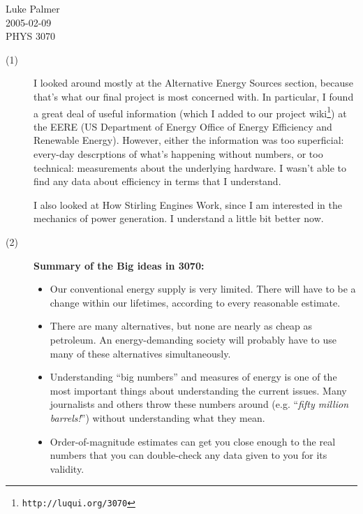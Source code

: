 \documentclass[12pt]{article}
\begin{document}
\noindent Luke Palmer \\
2005-02-09 \\
PHYS 3070

\begin{description}
\item[(1)] I looked around mostly at the Alternative Energy Sources
section, because that's what our final project is most concerned with.
In particular, I found a great deal of useful information (which I added
to our project wiki\footnote{\texttt{http://luqui.org/3070}}) at the
EERE (US Department of Energy Office of Energy Efficiency and Renewable
Energy).  However, either the information was too superficial: every-day
descrptions of what's happening without numbers, or too technical:
measurements about the underlying hardware.  I wasn't able to find any
data about efficiency in terms that I understand.

I also looked at How Stirling Engines Work, since I am interested in the
mechanics of power generation.  I understand a little bit better now.

\item[(2)] \textbf{Summary of the Big ideas in 3070:}
\begin{itemize}
\item Our conventional energy supply is very limited.  There will have
to be a change within our lifetimes, according to every reasonable
estimate.

\item There are many alternatives, but none are nearly as cheap as
petroleum.  An energy-demanding society will probably have to use many
of these alternatives simultaneously.

\item Understanding ``big numbers'' and measures of energy is one of the
most important things about understanding the current issues.  Many
journalists and others throw these numbers around (e.g. ``\textit{fifty
million barrels!}'') without understanding what they mean.

\item Order-of-magnitude estimates can get you close enough to the real
numbers that you can double-check any data given to you for its
validity.
\end{itemize}
\end{description}
\end{document}
